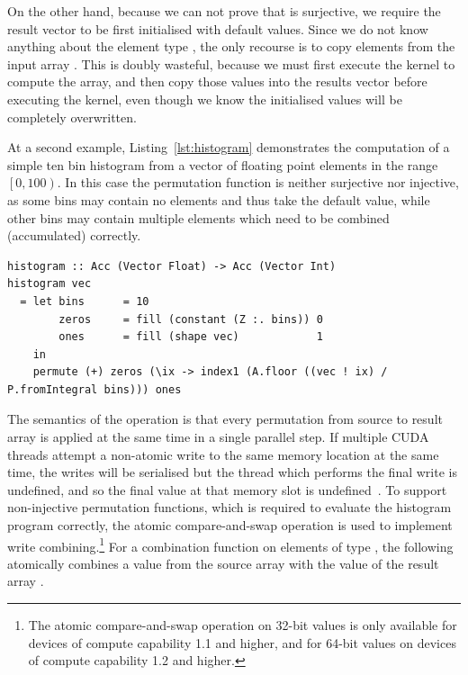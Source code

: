 On the other hand, because we can not prove that  is surjective, we
require the result vector to be first initialised with default values. Since we
do not know anything about the element type , the only recourse is to
copy elements from the input array . This is doubly wasteful, because
we must first execute the  kernel to compute the
 array, and then copy those values into the results vector before
executing the  kernel, even though we know the initialised values
will be completely overwritten.

At a second example, Listing~\ref{lst:histogram} demonstrates the computation of
a simple ten bin histogram from a vector of floating point elements in the range
$\left[ 0, 100 \right)$. In this case the permutation function is neither
surjective nor injective, as some bins may contain no elements and thus take the
default value, while other bins may contain multiple elements which need to be
combined (accumulated) correctly.
%
\begin{lstlisting}[style=haskell
    ,label=lst:histogram
    ,caption={[Simple histogram in Accelerate] A simple histogram written in
    Accelerate. We assume the input vector contains elements in the range
    $\left[0,100\right)$ and accumulate into ten equally sized bins.}]
histogram :: Acc (Vector Float) -> Acc (Vector Int)
histogram vec
  = let bins      = 10
        zeros     = fill (constant (Z :. bins)) 0
        ones      = fill (shape vec)            1
    in
    permute (+) zeros (\ix -> index1 (A.floor ((vec ! ix) / P.fromIntegral bins))) ones
\end{lstlisting}

The semantics of the operation is that every permutation from source to result
array is applied at the same time in a single parallel step. If multiple CUDA
threads attempt a non-atomic write to the same memory location at the same time,
the writes will be serialised but the thread which performs the final write is
undefined, and so the final value at that memory slot is
undefined~\cite{NVIDIA:2012wf}. To support non-injective permutation functions,
which is required to evaluate the histogram program correctly, the atomic
compare-and-swap operation is used to implement write combining.\footnote{The
atomic compare-and-swap operation on 32-bit values is only available for devices
of compute capability 1.1 and higher, and for 64-bit values on devices of
compute capability 1.2 and higher.} For a combination function  on
elements of type , the following atomically combines a value from the
source array  with the value of the result array .

